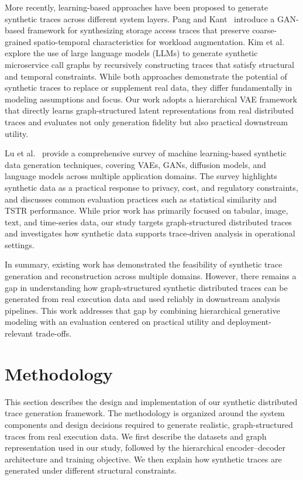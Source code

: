 \documentclass[sigconf,review]{acmart}
\begin{document}
More recently, learning-based approaches have been proposed to generate synthetic traces across different system layers. Pang and Kant~\cite{pang2026synthetic} introduce a GAN-based framework for synthesizing storage access traces that preserve coarse-grained spatio-temporal characteristics for workload augmentation. Kim et al.~\cite{kim2025large} explore the use of large language models (LLMs) to generate synthetic microservice call graphs by recursively constructing traces that satisfy structural and temporal constraints. While both approaches demonstrate the potential of synthetic traces to replace or supplement real data, they differ fundamentally in modeling assumptions and focus. Our work adopts a hierarchical VAE framework that directly learns graph-structured latent representations from real distributed traces and evaluates not only generation fidelity but also practical downstream utility.

Lu et al.~\cite{lu2023machine} provide a comprehensive survey of machine learning-based synthetic data generation techniques, covering VAEs, GANs, diffusion models, and language models across multiple application domains. The survey highlights synthetic data as a practical response to privacy, cost, and regulatory constraints, and discusses common evaluation practices such as statistical similarity and TSTR performance. While prior work has primarily focused on tabular, image, text, and time-series data, our study targets graph-structured distributed traces and investigates how synthetic data supports trace-driven analysis in operational settings.

In summary, existing work has demonstrated the feasibility of synthetic trace generation and reconstruction across multiple domains. However, there remains a gap in understanding how graph-structured synthetic distributed traces can be generated from real execution data and used reliably in downstream analysis pipelines. This work addresses that gap by combining hierarchical generative modeling with an evaluation centered on practical utility and deployment-relevant trade-offs.


\section{Methodology}
\label{sec:method}

This section describes the design and implementation of our synthetic distributed trace generation framework. The methodology is organized around the system components and design decisions required to generate realistic, graph-structured traces from real execution data. We first describe the datasets and graph representation used in our study, followed by the hierarchical encoder--decoder architecture and training objective. We then explain how synthetic traces are generated under different structural constraints.
\end{document}

